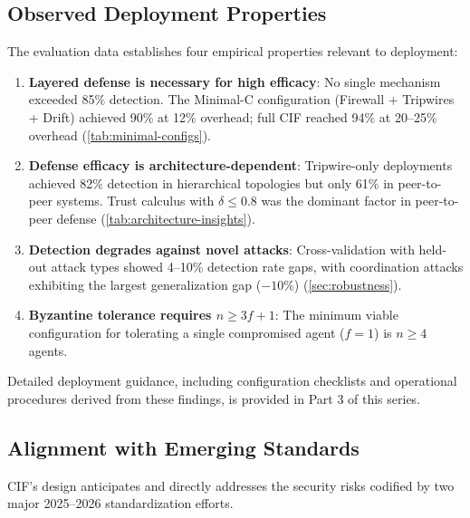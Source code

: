 \documentclass[
]{article}
\begin{document}
\subsection{Observed Deployment
Properties}\label{observed-deployment-properties}

The evaluation data establishes four empirical properties relevant to
deployment:

\begin{enumerate}
\def\labelenumi{\arabic{enumi}.}
\item
  \textbf{Layered defense is necessary for high efficacy}: No single
  mechanism exceeded 85\% detection. The Minimal-C configuration
  (Firewall + Tripwires + Drift) achieved 90\% at 12\% overhead; full
  CIF reached 94\% at 20--25\% overhead (\cref{tab:minimal-configs}).
\item
  \textbf{Defense efficacy is architecture-dependent}: Tripwire-only
  deployments achieved 82\% detection in hierarchical topologies but
  only 61\% in peer-to-peer systems. Trust calculus with
  \(\delta \leq 0.8\) was the dominant factor in peer-to-peer defense
  (\cref{tab:architecture-insights}).
\item
  \textbf{Detection degrades against novel attacks}: Cross-validation
  with held-out attack types showed 4--10\% detection rate gaps, with
  coordination attacks exhibiting the largest generalization gap
  (\(-10\%\)) (\cref{sec:robustness}).
\item
  \textbf{Byzantine tolerance requires \(n \geq 3f + 1\)}: The minimum
  viable configuration for tolerating a single compromised agent
  (\(f = 1\)) is \(n \geq 4\) agents.
\end{enumerate}

Detailed deployment guidance, including configuration checklists and
operational procedures derived from these findings, is provided in Part
3 of this series.

\subsection{Alignment with Emerging
Standards}\label{alignment-with-emerging-standards}

CIF's design anticipates and directly addresses the security risks
codified by two major 2025--2026 standardization efforts.
\end{document}

